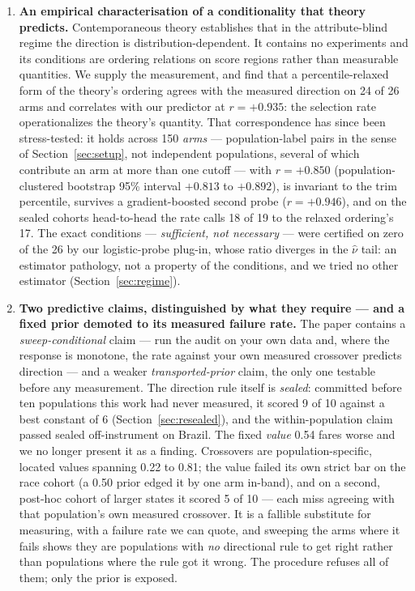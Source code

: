 \documentclass[9pt,conference]{IEEEtran}
\begin{document}
\begin{enumerate}
\item \textbf{An empirical characterisation of a conditionality that theory predicts.}
Contemporaneous theory \cite{backfire2026} establishes that in the attribute-blind regime
the direction is distribution-dependent. It contains no experiments and its conditions are
ordering relations on score regions rather than measurable quantities. We supply the
measurement, and find that a percentile-relaxed form of the theory's ordering agrees with
the measured direction on 24 of 26 arms and correlates with our predictor at $r = +0.935$:
the selection rate operationalizes the theory's quantity. That correspondence has since been
stress-tested: it holds across 150 \emph{arms} --- population-label pairs in the sense of
Section~\ref{sec:setup}, not independent populations, several of which contribute an arm at
more than one cutoff --- with $r = +0.850$ (population-clustered bootstrap 95\% interval
$+0.813$ to $+0.892$), is invariant to the trim percentile, survives a gradient-boosted
second probe ($r = +0.946$), and on the sealed cohorts head-to-head the rate calls 18 of 19
to the relaxed ordering's 17. The exact conditions --- \emph{sufficient, not necessary} ---
were certified on zero of the 26 by our logistic-probe plug-in, whose ratio diverges in the
$\hat\nu$ tail: an estimator pathology, not a property of the conditions, and we tried no
other estimator (Section~\ref{sec:regime}).

\item \textbf{Two predictive claims, distinguished by what they require --- and a fixed
prior demoted to its measured failure rate.} The paper contains a \emph{sweep-conditional}
claim --- run the audit on your own data and, where the response is monotone, the rate
against your own measured crossover predicts direction --- and a weaker
\emph{transported-prior} claim, the only one testable before any measurement. The direction
rule itself is \emph{sealed}: committed before ten populations this work had never measured,
it scored 9 of 10 against a best constant of 6 (Section~\ref{sec:resealed}), and the
within-population claim passed sealed off-instrument on Brazil. The fixed \emph{value} 0.54
fares worse and we no longer present it as a finding. Crossovers are population-specific, located values spanning 0.22 to 0.81; the value failed its own strict bar on the race cohort
(a 0.50 prior edged it by one arm in-band), and on a second, post-hoc cohort of larger
states it scored 5 of 10 --- each miss agreeing with that population's own measured
crossover. It is a fallible substitute for measuring, with a failure rate we can quote, and
sweeping the arms where it fails shows they are populations with \emph{no} directional rule
to get right rather than populations where the rule got it wrong. The procedure refuses all
of them; only the prior is exposed.


\end{enumerate}
\end{document}
